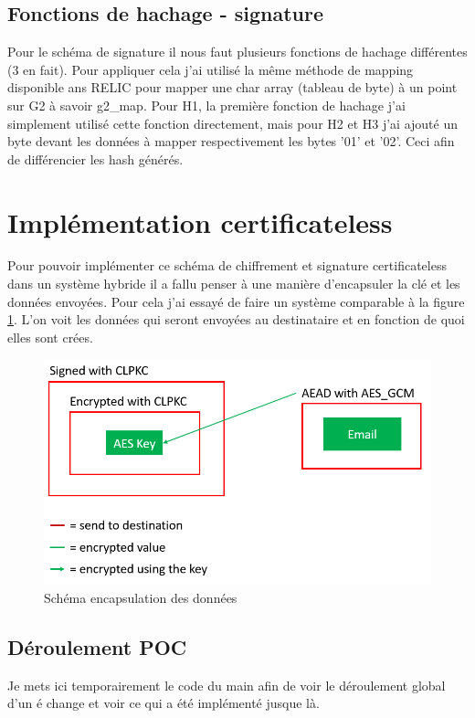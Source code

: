 \subsection{Fonctions de hachage - signature}
Pour le schéma de signature il nous faut plusieurs fonctions de hachage différentes (3 en fait). Pour appliquer cela j'ai utilisé la même méthode de mapping disponible ans RELIC pour mapper une char array (tableau de byte) à un point sur G2 à savoir g2\_map.
Pour H1, la première fonction de hachage j'ai simplement utilisé cette fonction directement, mais pour H2 et H3 j'ai ajouté un byte devant les données à mapper respectivement les bytes '01' et '02'. Ceci afin de différencier les hash générés.

\section{Implémentation certificateless}
Pour pouvoir implémenter ce schéma de chiffrement et signature certificateless dans un système hybride il a fallu penser à une manière d'encapsuler la clé et les données envoyées. Pour cela j'ai essayé de faire un système comparable à la figure \ref{fig:encapsulate}. L'on voit les données qui seront envoyées au destinataire et en fonction de quoi elles sont crées.
\begin{figure}[h!]
	\centering
	\includegraphics[width=12cm]{images/schemaEncapsulation.png}
	\caption{Schéma encapsulation des données}
	\label{fig:encapsulate}
\end{figure}

\subsection{Déroulement POC}
Je mets ici temporairement le code du main afin de voir le déroulement global d'un é change et voir ce qui a été implémenté jusque là.
\inputminted[linenos, numbersep=4pt,fontsize=\footnotesize, breaklines=true]{C}{source_code/main.c}